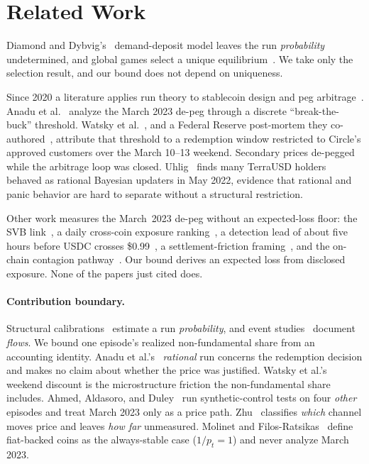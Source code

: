 \section{Related Work}
\label{sec:lit}

Diamond and Dybvig's~\cite{diamonddybvig1983} demand-deposit model leaves the run
\emph{probability} undetermined, and global games select a unique
equilibrium~\cite{carlssonvandamme1993,morrisshin1998,goldsteinpauzner2005}. We take only
the selection result, and our bound does not depend on uniqueness.

Since 2020 a literature applies run theory to stablecoin design and peg
arbitrage~\cite{Moin_2020,Klages_Mundt_2020,Lyons_2023,ahmed2025stablecoins}. Anadu et
al.~\cite{anadu2024} analyze the March 2023 de-peg through a discrete ``break-the-buck''
threshold. Watsky et al.~\cite{watsky2024}, and a Federal Reserve
post-mortem they co-authored~\cite{fedshadow2025}, attribute that threshold to a redemption window restricted
to Circle's approved customers over the March 10--13 weekend. Secondary prices de-pegged
while the arbitrage loop was closed. Uhlig~\cite{uhlig2022} finds many TerraUSD holders
behaved as rational Bayesian updaters in May 2022, evidence that rational and panic
behavior are hard to separate without a structural restriction.

Other work measures the March~2023 de-peg without an expected-loss floor: the SVB
link~\cite{galaticapalbo2023}, a daily cross-coin exposure ranking~\cite{diop2024fintech},
a detection lead of about five hours before USDC crosses
\$0.99~\cite{cintraholloway2023depegs}, a settlement-friction
framing~\cite{li2026settlementfriction}, and the on-chain contagion
pathway~\cite{sankaewtong2026contagion}. Our bound derives an expected loss from disclosed
exposure. None of the papers just cited does.

\paragraph{Contribution boundary.} Structural calibrations~\cite{mzz2025} estimate a run
\emph{probability}, and event studies~\cite{anadu2024} document \emph{flows}. We bound one
episode's realized non-fundamental share from an accounting identity. Anadu et
al.'s~\cite{anadu2024} \emph{rational} run concerns the redemption decision and makes no
claim about whether the price was justified. Watsky et al.'s~\cite{watsky2024} weekend
discount is the microstructure friction the non-fundamental share includes. Ahmed,
Aldasoro, and Duley~\cite{ahmedaldasoroduley2024} run synthetic-control tests on four
\emph{other} episodes and treat March 2023 only as a price path.
Zhu~\cite{zhu2026redemptions} classifies \emph{which} channel moves price and leaves
\emph{how far} unmeasured. Molinet and Filos-Ratsikas~\cite{molinetfilos2026} define
fiat-backed coins as the always-stable case ($1/p_t=1$) and never analyze March 2023.
